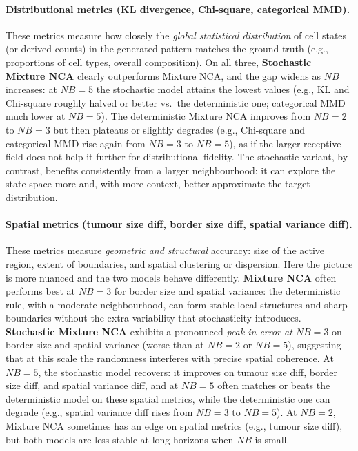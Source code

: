 \paragraph{Distributional metrics (KL divergence, Chi-square, categorical MMD).}
These metrics measure how closely the \emph{global statistical distribution} of cell states (or derived counts) in the generated pattern matches the ground truth (e.g., proportions of cell types, overall composition).
On all three, \textbf{Stochastic Mixture NCA} clearly outperforms Mixture NCA, and the gap widens as \(NB\) increases: at \(NB=5\) the stochastic model attains the lowest values (e.g., KL and Chi-square roughly halved or better vs.\ the deterministic one; categorical MMD much lower at \(NB=5\)).
The deterministic Mixture NCA improves from \(NB=2\) to \(NB=3\) but then plateaus or slightly degrades (e.g., Chi-square and categorical MMD rise again from \(NB=3\) to \(NB=5\)), as if the larger receptive field does not help it further for distributional fidelity.
The stochastic variant, by contrast, benefits consistently from a larger neighbourhood: it can explore the state space more and, with more context, better approximate the target distribution.

\paragraph{Spatial metrics (tumour size diff, border size diff, spatial variance diff).}
These metrics measure \emph{geometric and structural} accuracy: size of the active region, extent of boundaries, and spatial clustering or dispersion.
Here the picture is more nuanced and the two models behave differently.
\textbf{Mixture NCA} often performs best at \textbf{\(NB=3\)} for border size and spatial variance: the deterministic rule, with a moderate neighbourhood, can form stable local structures and sharp boundaries without the extra variability that stochasticity introduces.
\textbf{Stochastic Mixture NCA} exhibits a pronounced \emph{peak in error at \(NB=3\)} on border size and spatial variance (worse than at \(NB=2\) or \(NB=5\)), suggesting that at this scale the randomness interferes with precise spatial coherence.
At \textbf{\(NB=5\)}, the stochastic model recovers: it improves on tumour size diff, border size diff, and spatial variance diff, and at \(NB=5\) often matches or beats the deterministic model on these spatial metrics, while the deterministic one can degrade (e.g., spatial variance diff rises from \(NB=3\) to \(NB=5\)).
At \(NB=2\), Mixture NCA sometimes has an edge on spatial metrics (e.g., tumour size diff), but both models are less stable at long horizons when \(NB\) is small.

